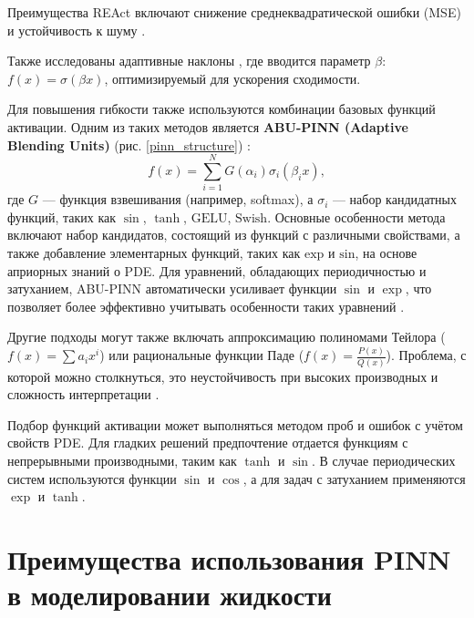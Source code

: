 Преимущества REAct включают снижение среднеквадратической ошибки (MSE) и устойчивость к шуму
\cite{0d752c79fb816703274a3d37f85a85689a2a9405}.

Также исследованы адаптивные наклоны \cite{7fcd4b3c875d8e41eb0c184aa1a42bf4c8906d61}, где вводится параметр
$\beta$: $f(x) = \sigma(\beta x)$, оптимизируемый для ускорения сходимости.

Для повышения гибкости также используются комбинации базовых функций активации. Одним из таких методов является
\textbf{ABU-PINN (Adaptive Blending Units)} (рис. \ref{pinn_structure}) \cite{Sutfeld2018-io}\cite{7fcd4b3c875d8e41eb0c184aa1a42bf4c8906d61}:
\begin{equation}
    f(x) = \sum_{i=1}^N G(\alpha_i) \sigma_i(\beta_i x),
    \label{eq:abu}
\end{equation}
где $G$ — функция взвешивания (например, softmax), а $\sigma_i$ — набор кандидатных функций, таких как
$\sin$, $\tanh$, $\mathrm{GELU}$, $\mathrm{Swish}$. 
Основные особенности метода включают набор кандидатов, состоящий из функций с различными свойствами, а
также добавление элементарных функций, таких как $\mathrm{exp}$ и $\mathrm{sin}$, на основе априорных знаний о PDE.
Для уравнений, обладающих периодичностью и затуханием, ABU-PINN автоматически усиливает функции
$\sin$ и $\exp$, что позволяет более эффективно учитывать особенности таких уравнений
\cite{7fcd4b3c875d8e41eb0c184aa1a42bf4c8906d61}.



Другие подходы могут также включать аппроксимацию полиномами Тейлора ($f(x) = \sum a_i x^i$) или
рациональные функции Паде ($f(x) = \frac{P(x)}{Q(x)}$).
Проблема, с которой можно столкнуться, это неустойчивость при высоких производных и сложность
интерпретации \cite{7fcd4b3c875d8e41eb0c184aa1a42bf4c8906d61}.

Подбор функций активации может выполняться методом проб и ошибок с учётом свойств PDE. Для гладких решений
предпочтение отдается функциям с непрерывными производными, таким как $\tanh$ и $\sin$. В случае периодических
систем используются функции $\sin$ и $\cos$, а для задач с затуханием применяются $\exp$ и $\tanh$.


\section{Преимущества использования PINN в моделировании жидкости}
